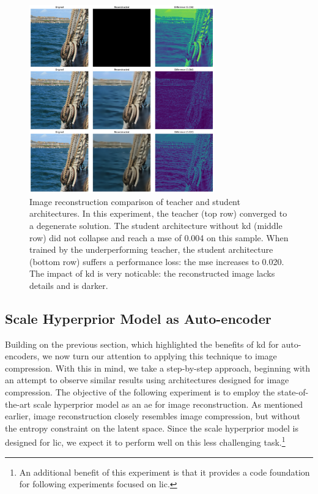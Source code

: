 \begin{figure}
    \centering
    \includegraphics[width=8cm]{../img/kd_ae_test_1.png}
    \caption[Image reconstruction comparison of teacher and student architectures.]{Image reconstruction comparison of teacher and student architectures. In this experiment, the teacher (top row) converged to a degenerate solution. The student architecture without \acrshort{kd} (middle row) did not collapse and reach a \acrshort{mse} of 0.004 on this sample. When trained by the underperforming teacher, the student architecture (bottom row) suffers a performance loss: the \acrshort{mse} increases to 0.020. The impact of \acrshort{kd} is very noticable: the reconstructed image lacks details and is darker.}
    \label{kd_ae_test_1}
\end{figure}

\subsection{Scale Hyperprior Model as Auto-encoder}
\label{scale_hyperprior_ae}
Building on the previous section, which highlighted the benefits of \acrshort{kd} for auto-encoders, we now turn our attention to applying this technique to image compression. With this in mind, we take a step-by-step approach, beginning with an attempt to observe similar results using architectures designed for image compression. The objective of the following experiment is to employ the state-of-the-art scale hyperprior model as an \acrshort{ae} for image reconstruction. As mentioned earlier, image reconstruction closely resembles image compression, but without the entropy constraint on the latent space. Since the scale hyperprior model is designed for \acrshort{lic}, we expect it to perform well on this less challenging task.\footnote{An additional benefit of this experiment is that it provides a code foundation for following experiments focused on \acrshort{lic}.}

